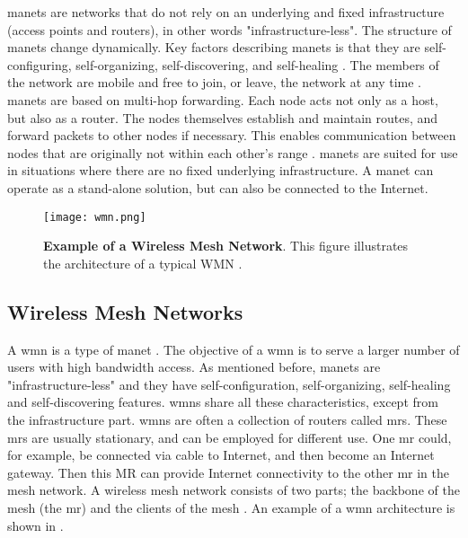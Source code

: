 \glspl{manet} are networks that do not rely on an underlying and fixed infrastructure (access points and routers), in other words "infrastructure-less". The structure of \glspl{manet} change dynamically. Key factors describing \glspl{manet} is that they are self-configuring, self-organizing, self-discovering, and self-healing \cite{wmn}. The members of the network are mobile and free to join, or leave, the network at any time \cite{adhoc2}. \glspl{manet} are based on multi-hop forwarding. Each node acts not only as a host, but also as a router. The nodes themselves establish and maintain routes, and forward packets to other nodes if necessary. This enables communication between nodes that are originally not within each other's range \cite{adhoc2}. \glspl{manet} are suited for use in situations where there are no fixed underlying infrastructure. A \gls{manet} can operate as a stand-alone solution, but can also be connected to the Internet. 

\begin{figure}[t]
  \centering
    \texttt{[image: wmn.png]}
     \caption [Example of a Wireless Mesh Network]{\textbf{Example of a Wireless Mesh Network}. This figure illustrates the architecture of a typical WMN \cite{wmn}.}
\label{fig:wmn}
\end{figure}

\subsection{Wireless Mesh Networks}
\label{subsec:mesh}
A \gls{wmn} is a type of \gls{manet} \cite{wmn}. The objective of a \gls{wmn} is to serve a larger number of users with high bandwidth access. As mentioned before, \glspl{manet} are "infrastructure-less" and they have self-configuration, self-organizing, self-healing and self-discovering features. \glspl{wmn} share all these characteristics, except from the infrastructure part. \glspl{wmn} are often a collection of routers called \glspl{mr}. These \glspl{mr} are usually stationary, and can be employed for different use. One \gls{mr} could, for example, be connected via cable to Internet, and then become an Internet gateway. Then this MR can provide Internet connectivity to the other \gls{mr} in the mesh network. A wireless mesh network consists of two parts; the backbone of the mesh (the \gls{mr}) and the clients of the mesh \cite{wmn}. An example of a \gls{wmn} architecture is shown in . 


